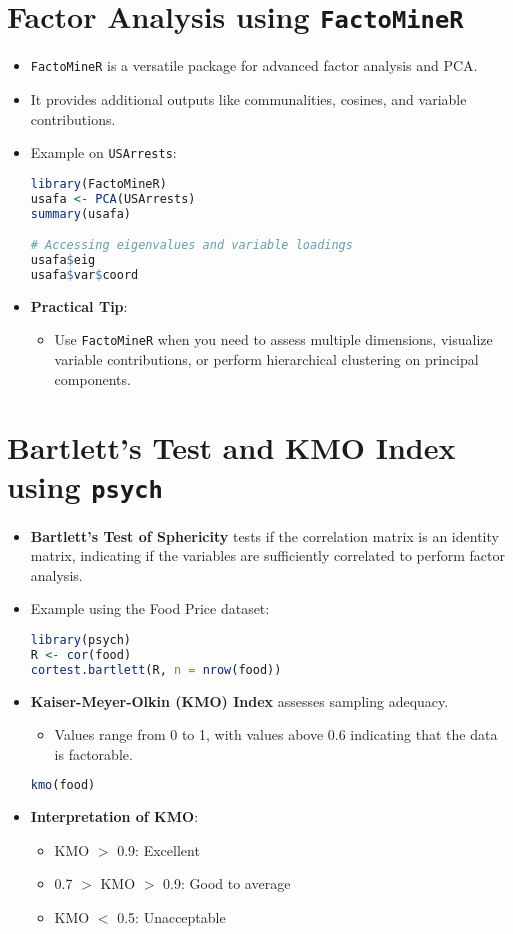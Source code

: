 \documentclass{article}
\begin{document}
\section{Factor Analysis using \texttt{FactoMineR}}
\begin{itemize}
    \item \texttt{FactoMineR} is a versatile package for advanced factor analysis and PCA.
    \item It provides additional outputs like communalities, cosines, and variable contributions.
    \item Example on \texttt{USArrests}:
\begin{lstlisting}[language=R]
library(FactoMineR)
usafa <- PCA(USArrests)
summary(usafa)

# Accessing eigenvalues and variable loadings
usafa$eig
usafa$var$coord
\end{lstlisting}

\item \textbf{Practical Tip}:
    \begin{itemize}
        \item Use \texttt{FactoMineR} when you need to assess multiple dimensions, visualize variable contributions, or perform hierarchical clustering on principal components.
    \end{itemize}
\end{itemize}

\section{Bartlett's Test and KMO Index using \texttt{psych}}
\begin{itemize}
    \item \textbf{Bartlett’s Test of Sphericity} tests if the correlation matrix is an identity matrix, indicating if the variables are sufficiently correlated to perform factor analysis.
    \item Example using the Food Price dataset:
\begin{lstlisting}[language=R]
library(psych)
R <- cor(food)
cortest.bartlett(R, n = nrow(food))
\end{lstlisting}

\item \textbf{Kaiser-Meyer-Olkin (KMO) Index} assesses sampling adequacy.
    \begin{itemize}
        \item Values range from 0 to 1, with values above 0.6 indicating that the data is factorable.
    \end{itemize}
\begin{lstlisting}[language=R]
kmo(food)
\end{lstlisting}
\item \textbf{Interpretation of KMO}:
    \begin{itemize}
        \item KMO $>$ 0.9: Excellent
        \item 0.7 $>$ KMO $>$ 0.9: Good to average
        \item KMO $<$ 0.5: Unacceptable
    \end{itemize}
\end{itemize}
\end{document}
